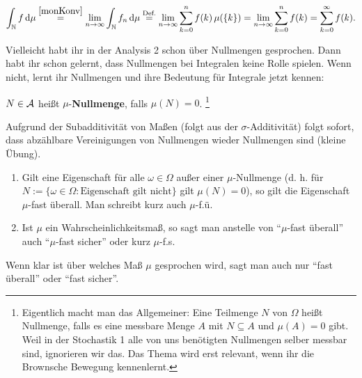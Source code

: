 \begin{beispiel}
\begin{itemize}
		\begin{align*}
			\int_{\mathbb{N}} f\, \mathrm{d}\mu\overset{\eqref{monKonv}}{=} \lim_{n\to\infty} \int_{\mathbb{N}} f_n\, \mathrm{d}\mu\overset{\text{Def.}}{=}\lim_{n\to\infty} \sum_{k=0}^n f(k)\, \mu(\{k\})=\lim_{n\to\infty} \sum_{k=0}^n f(k)= \sum_{k=0}^\infty f(k).
		\end{align*}				
	\end{itemize}
\end{beispiel}
Vielleicht habt ihr in der Analysis 2 schon \"uber Nullmengen gesprochen. Dann habt ihr schon gelernt, dass Nullmengen bei Integralen keine Rolle spielen. Wenn nicht, lernt ihr Nullmengen und ihre Bedeutung f\"ur Integrale jetzt kennen:
\begin{deff}\label{def:Nullmenge}
	$ N \in \mathcal{A}$ heißt $ \mu $-\textbf{Nullmenge}, falls $ \mu (N) = 0$. \footnote{Eigentlich macht man das Allgemeiner: Eine Teilmenge $N$ von $\Omega$ hei\ss t Nullmenge, falls es eine messbare Menge $A$ mit $N\subseteq A$ und $\mu(A)=0$ gibt. Weil in der Stochastik 1 alle von uns ben\"otigten Nullmengen selber messbar sind, ignorieren wir das. Das Thema wird erst relevant, wenn ihr die Brownsche Bewegung kennenlernt.
	}
\end{deff}
Aufgrund der Subadditivit\"at von Ma\ss en (folgt aus der $\sigma$-Additivit\"at) folgt sofort, dass abz\"ahlbare Vereinigungen von Nullmengen wieder Nullmengen sind (kleine \"Ubung).



\begin{deff}
	\begin{enumerate}[label=(\roman*)]
		\item Gilt eine Eigenschaft für alle $\omega \in \Omega$ außer einer $\mu$-Nullmenge (d. h. f\"ur $N:=\{\omega \in \Omega: \text{Eigenschaft gilt nicht}\}$ gilt $\mu(N)=0$), so gilt die Eigenschaft $\mu$-fast überall. Man schreibt kurz auch $\mu$-f.\"u.
		\item Ist $\mu$ ein Wahrscheinlichkeitsmaß, so sagt man anstelle von \enquote{$\mu$-fast überall} auch \enquote{$\mu$-fast sicher} oder kurz $\mu$-f.s.
	\end{enumerate}
\end{deff}
Wenn klar ist \"uber welches Ma\ss{} $\mu$ gesprochen wird, sagt man auch nur \enquote{fast \"uberall} oder \enquote{fast sicher}.\smallskip
\marginpar{\textcolor{red}{Vorlesung 11}}

